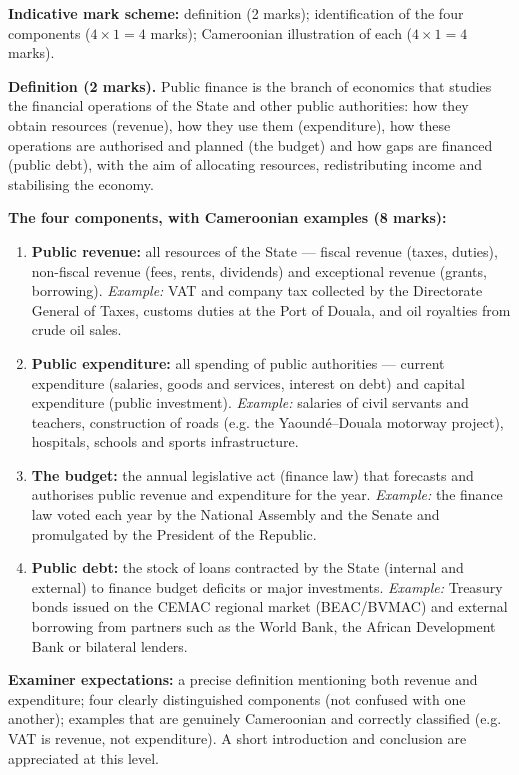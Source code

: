 \documentclass[11pt]{article}
\newcommand{\cle}[1]{{\popxbold\color{popdark}#1}}
\begin{document}
\begin{corrige}
\textbf{Indicative mark scheme:} definition (2 marks); identification of the four components ($4 \times 1 = 4$ marks); Cameroonian illustration of each ($4 \times 1 = 4$ marks).

\textbf{Definition (2 marks).} \cle{Public finance} is the branch of economics that studies the financial operations of the State and other public authorities: how they obtain resources (revenue), how they use them (expenditure), how these operations are authorised and planned (the budget) and how gaps are financed (public debt), with the aim of allocating resources, redistributing income and stabilising the economy.

\textbf{The four components, with Cameroonian examples (8 marks):}
\begin{enumerate}
\item \textbf{Public revenue:} all resources of the State — fiscal revenue (taxes, duties), non-fiscal revenue (fees, rents, dividends) and exceptional revenue (grants, borrowing). \emph{Example:} VAT and company tax collected by the Directorate General of Taxes, customs duties at the Port of Douala, and oil royalties from crude oil sales.
\item \textbf{Public expenditure:} all spending of public authorities — current expenditure (salaries, goods and services, interest on debt) and capital expenditure (public investment). \emph{Example:} salaries of civil servants and teachers, construction of roads (e.g. the Yaoundé–Douala motorway project), hospitals, schools and sports infrastructure.
\item \textbf{The budget:} the annual legislative act (finance law) that forecasts and authorises public revenue and expenditure for the year. \emph{Example:} the finance law voted each year by the National Assembly and the Senate and promulgated by the President of the Republic.
\item \textbf{Public debt:} the stock of loans contracted by the State (internal and external) to finance budget deficits or major investments. \emph{Example:} Treasury bonds issued on the CEMAC regional market (BEAC/BVMAC) and external borrowing from partners such as the World Bank, the African Development Bank or bilateral lenders.
\end{enumerate}

\textbf{Examiner expectations:} a precise definition mentioning both revenue and expenditure; four clearly distinguished components (not confused with one another); examples that are genuinely Cameroonian and correctly classified (e.g. VAT is revenue, not expenditure). A short introduction and conclusion are appreciated at this level.
\end{corrige}
\end{document}
